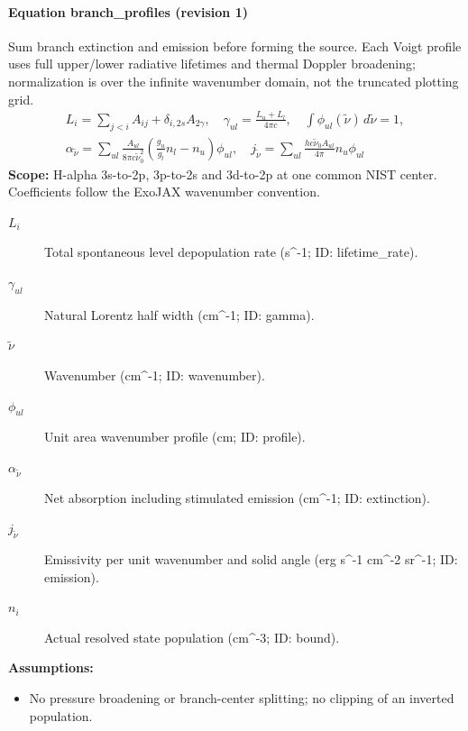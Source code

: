 \paragraph{Equation branch\_profiles (revision 1)}
Sum branch extinction and emission before forming the source. Each Voigt profile uses full upper/lower radiative lifetimes and thermal Doppler broadening; normalization is over the infinite wavenumber domain, not the truncated plotting grid.
\begin{equation}
\begin{aligned}
L_i=\sum_{j<i}A_{ij}+\delta_{i,2s}A_{2\gamma},\quad \gamma_{ul}=\frac{L_u+L_l}{4\pi c},\quad\int\phi_{ul}(\widetilde\nu)\,d\widetilde\nu=1,\\ \alpha_{\widetilde\nu}=\sum_{ul}\frac{A_{ul}}{8\pi c\widetilde\nu_0^2} \left(\frac{g_u}{g_l}n_l-n_u\right)\phi_{ul},\quad j_{\widetilde\nu}=\sum_{ul}\frac{hc\widetilde\nu_0A_{ul}}{4\pi}n_u\phi_{ul}
\end{aligned}
\label{eq:escape.nlte_5f_spectrum:branch_5f_profiles:1}
\end{equation}
\noindent\textbf{Scope:} H-alpha 3s-to-2p, 3p-to-2s and 3d-to-2p at one common NIST center. Coefficients follow the ExoJAX wavenumber convention.

\begin{description}
\item[$L_i$] Total spontaneous level depopulation rate (s\textasciicircum{}-1; ID: lifetime\_rate).
\item[$\gamma_{ul}$] Natural Lorentz half width (cm\textasciicircum{}-1; ID: gamma).
\item[$\widetilde\nu$] Wavenumber (cm\textasciicircum{}-1; ID: wavenumber).
\item[$\phi_{ul}$] Unit area wavenumber profile (cm; ID: profile).
\item[$\alpha_{\widetilde\nu}$] Net absorption including stimulated emission (cm\textasciicircum{}-1; ID: extinction).
\item[$j_{\widetilde\nu}$] Emissivity per unit wavenumber and solid angle (erg s\textasciicircum{}-1 cm\textasciicircum{}-2 sr\textasciicircum{}-1; ID: emission).
\item[$n_i$] Actual resolved state population (cm\textasciicircum{}-3; ID: bound).
\end{description}

\noindent\textbf{Assumptions:}
\begin{itemize}
\item No pressure broadening or branch-center splitting; no clipping of an inverted population.
\end{itemize}

